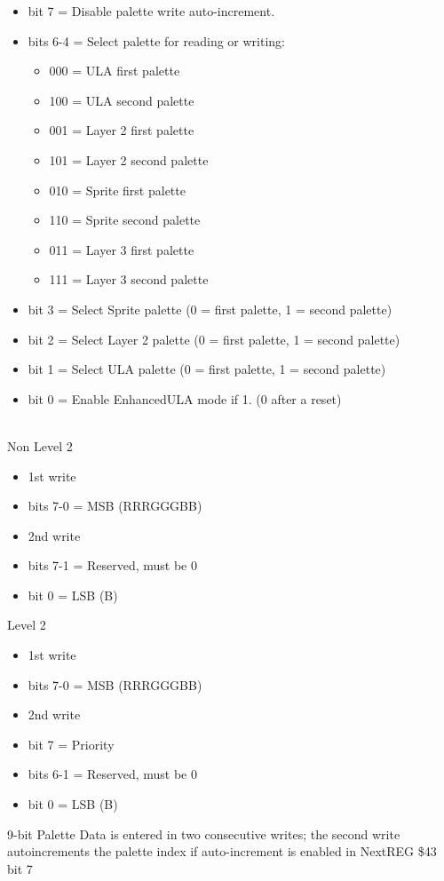 \begin{itemize}
\item bit 7 = Disable palette write auto-increment.
\item bits 6-4 = Select palette for reading or writing:
  \begin{itemize}
  \item 000 = ULA first palette
  \item 100 = ULA second palette
  \item 001 = Layer 2 first palette
  \item 101 = Layer 2 second palette
  \item 010 = Sprite first palette
  \item 110 = Sprite second palette
  \item 011 = Layer 3 first palette
  \item 111 = Layer 3 second palette
  \end{itemize}
\item bit 3 = Select Sprite palette (0 = first palette, 1 = second
  palette)
\item bit 2 = Select Layer 2 palette (0 = first palette, 1 = second
  palette)
\item bit 1 = Select ULA palette (0 = first palette, 1 = second
  palette)
\item bit 0 = Enable EnhancedULA mode if 1. (0 after a reset)
\end{itemize}

\\
Non Level 2
\begin{itemize}
\item[] 1st write
\item bits 7-0 = MSB (RRRGGGBB)
\item[] 2nd write
\item bits 7-1 = Reserved, must be 0
\item bit 0 = LSB (B)
\end{itemize}
Level 2
\begin{itemize}
\item[] 1st write
\item bits 7-0 = MSB (RRRGGGBB)
\item[] 2nd write
\item bit 7 = Priority
\item bits 6-1 = Reserved, must be 0
\item bit 0 = LSB (B)
\end{itemize}
9-bit Palette Data is entered in two consecutive writes; the second
write autoincrements the palette index if auto-increment is enabled in
NextREG \$43 bit 7

